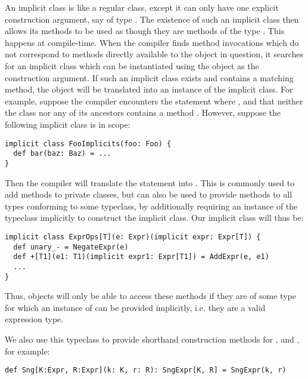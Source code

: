 An implicit class is like a regular class, except it can only have one explicit construction argument, say of type . The existence of such an implicit class then allows its methods to be used as though they are methods of the type . This happens at compile-time. When the compiler finds method invocations which do not correspond to methods directly available to the object in question, it searches for an implicit class which can be instantiated using the object as the construction argument. If such an implicit class exists and contains a matching method, the object will be translated into an instance of the implicit class.
For example, suppose the compiler encounters the statement  where , and that neither the class  nor any of its ancestors contains a method . However, suppose the following implicit class is in scope:
\vs\begin{lstlisting}
implicit class FooImplicits(foo: Foo) {
  def bar(baz: Baz) = ...
}
\end{lstlisting}\vs
Then the compiler will translate the statement  into . This is commonly used to add methods to private classes, but can also be used to provide methods to all types conforming to some typeclass, by additionally requiring an instance of the typeclass implicitly to construct the implicit class. Our implicit class will thus be:
\vs \begin{lstlisting}
implicit class ExprOps[T](e: Expr)(implicit expr: Expr[T]) {
  def unary_- = NegateExpr(e)
  def +[T1](e1: T1)(implicit expr1: Expr[T1]) = AddExpr(e, e1)
  ...
}
\end{lstlisting} \vs
Thus, objects will only be able to access these methods if they are of some type  for which an instance of  can be provided implicitly, i.e. they are a valid expression type.

We also use this typeclass to provide shorthand construction methods for ,  and , for example:
\begin{lstlisting}
def Sng[K:Expr, R:Expr](k: K, r: R): SngExpr[K, R] = SngExpr(k, r)
\end{lstlisting}


